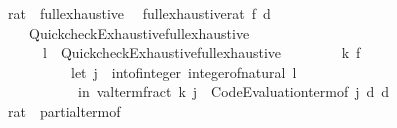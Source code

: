 \begin{isabellebody}
{\isafoldproof}%
%
\isadelimproof
%
\endisadelimproof
\isanewline
\isanewline
{}\isamarkupfalse%
\isanewline
\isanewline
{}\isamarkupfalse%
\ rat\ {\isacharcolon}{\kern0pt}{\isacharcolon}{\kern0pt}\ full{\isacharunderscore}{\kern0pt}exhaustive\isanewline
{}\isanewline
\isanewline
{}\isamarkupfalse%
\isanewline
\ \ {\isachardoublequoteopen}full{\isacharunderscore}{\kern0pt}exhaustive{\isacharunderscore}{\kern0pt}rat\ f\ d\ {\isacharequal}{\kern0pt}\isanewline
\ \ \ \ Quickcheck{\isacharunderscore}{\kern0pt}Exhaustive{\isachardot}{\kern0pt}full{\isacharunderscore}{\kern0pt}exhaustive\isanewline
\ \ \ \ \ \ {\isacharparenleft}{\kern0pt}{\isasymlambda}{\isacharparenleft}{\kern0pt}l{\isacharcomma}{\kern0pt}\ {\isacharunderscore}{\kern0pt}{\isacharparenright}{\kern0pt}{\isachardot}{\kern0pt}\ Quickcheck{\isacharunderscore}{\kern0pt}Exhaustive{\isachardot}{\kern0pt}full{\isacharunderscore}{\kern0pt}exhaustive\isanewline
\ \ \ \ \ \ \ \ {\isacharparenleft}{\kern0pt}{\isasymlambda}k{\isachardot}{\kern0pt}\ f\isanewline
\ \ \ \ \ \ \ \ \ \ {\isacharparenleft}{\kern0pt}let\ j\ {\isacharequal}{\kern0pt}\ int{\isacharunderscore}{\kern0pt}of{\isacharunderscore}{\kern0pt}integer\ {\isacharparenleft}{\kern0pt}integer{\isacharunderscore}{\kern0pt}of{\isacharunderscore}{\kern0pt}natural\ l{\isacharparenright}{\kern0pt}\ {\isacharplus}{\kern0pt}\ {}\isanewline
\ \ \ \ \ \ \ \ \ \ \ in\ valterm{\isacharunderscore}{\kern0pt}fract\ k\ {\isacharparenleft}{\kern0pt}j{\isacharcomma}{\kern0pt}\ {\isasymlambda}{\isacharunderscore}{\kern0pt}{\isachardot}{\kern0pt}\ Code{\isacharunderscore}{\kern0pt}Evaluation{\isachardot}{\kern0pt}term{\isacharunderscore}{\kern0pt}of\ j{\isacharparenright}{\kern0pt}{\isacharparenright}{\kern0pt}{\isacharparenright}{\kern0pt}\ d{\isacharparenright}{\kern0pt}\ d{\isachardoublequoteclose}\isanewline
\isanewline
{}\isamarkupfalse%
%
\isadelimproof
\ %
\endisadelimproof
%
\isatagproof
\isacommand{{\isachardot}{\kern0pt}{\isachardot}{\kern0pt}}\isamarkupfalse%
%
\endisatagproof
{\isafoldproof}%
%
\isadelimproof
%
\endisadelimproof
\isanewline
\isanewline
{}\isamarkupfalse%
\isanewline
\isanewline
{}\isamarkupfalse%
\ rat\ {\isacharcolon}{\kern0pt}{\isacharcolon}{\kern0pt}\ partial{\isacharunderscore}{\kern0pt}term{\isacharunderscore}{\kern0pt}of%
\isadelimproof
\ %
\endisadelimproof
%
\isatagproof
\isacommand{{\isachardot}{\kern0pt}{\isachardot}{\kern0pt}}\isamarkupfalse%
%
\endisatagproof
{\isafoldproof}%
%
\isadelimproof

\end{isabellebody}
